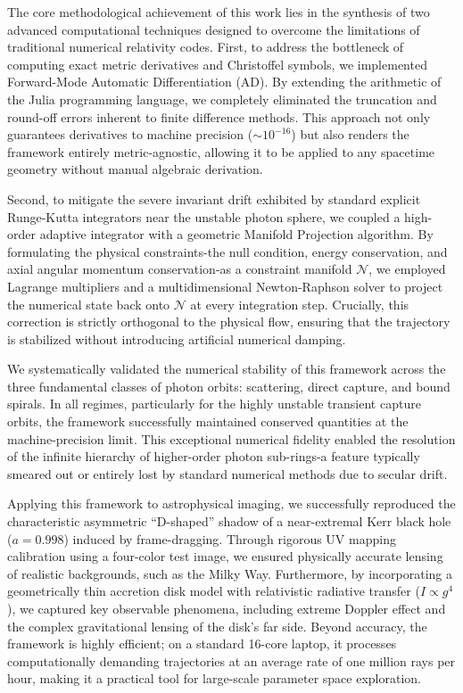 \documentclass[11pt]{book}
\begin{document}
The core methodological achievement of this work lies in the synthesis of two advanced computational techniques designed to overcome the limitations of traditional numerical relativity codes. First, to address the bottleneck of computing exact metric derivatives and Christoffel symbols, we implemented Forward-Mode Automatic Differentiation (AD). By extending the arithmetic of the Julia programming language, we completely eliminated the truncation and round-off errors inherent to finite difference methods. This approach not only guarantees derivatives to machine precision ($\sim 10^{-16}$) but also renders the framework entirely metric-agnostic, allowing it to be applied to any spacetime geometry without manual algebraic derivation.

Second, to mitigate the severe invariant drift exhibited by standard explicit Runge-Kutta integrators near the unstable photon sphere, we coupled a high-order adaptive integrator with a geometric Manifold Projection algorithm. By formulating the physical constraints-the null condition, energy conservation, and axial angular momentum conservation-as a constraint manifold $\mathcal{N}$, we employed Lagrange multipliers and a multidimensional Newton-Raphson solver to project the numerical state back onto $\mathcal{N}$ at every integration step. Crucially, this correction is strictly orthogonal to the physical flow, ensuring that the trajectory is stabilized without introducing artificial numerical damping.

We systematically validated the numerical stability of this framework across the three fundamental classes of photon orbits: scattering, direct capture, and bound spirals. In all regimes, particularly for the highly unstable transient capture orbits, the framework successfully maintained conserved quantities at the machine-precision limit. This exceptional numerical fidelity enabled the resolution of the infinite hierarchy of higher-order photon sub-rings-a feature typically smeared out or entirely lost by standard numerical methods due to secular drift.

Applying this framework to astrophysical imaging, we successfully reproduced the characteristic asymmetric ``D-shaped'' shadow of a near-extremal Kerr black hole ($a=0.998$) induced by frame-dragging. Through rigorous UV mapping calibration using a four-color test image, we ensured physically accurate lensing of realistic backgrounds, such as the Milky Way. Furthermore, by incorporating a geometrically thin accretion disk model with relativistic radiative transfer ($I \propto g^4$), we captured key observable phenomena, including extreme Doppler effect and the complex gravitational lensing of the disk's far side. Beyond accuracy, the framework is highly efficient; on a standard 16-core laptop, it processes computationally demanding trajectories at an average rate of one million rays per hour, making it a practical tool for large-scale parameter space exploration.
\end{document}
